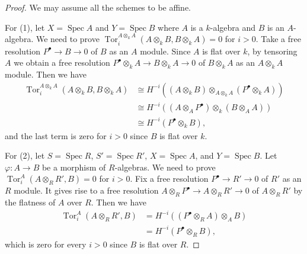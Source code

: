 \documentclass[12pt]{amsart}
\numberwithin{equation}{section}
\theoremstyle{plain}
\theoremstyle{definition}
\DeclareMathOperator{\Tor}{\mathrm{Tor}}
\DeclareMathOperator{\Spec}{\mathrm{Spec}}
\begin{document}
\begin{proof}
    We may assume all the schemes to be affine.

    For (1), let $X = \Spec A$ and $Y = \Spec B$ where $A$ is a $k$-algebra and $B$ is an $A$-algebra.
    We need to prove $\Tor_i^{A \otimes_k A}(A \otimes_k B, B\otimes_k A)=0$ for $i>0$.
    Take a free resolution $P^\bullet \to B \to 0$ of $B$ as an $A$ module.
    Since $A$ is flat over $k$, by tensoring $A$ we obtain a free resolution
    $
        P^\bullet \otimes_k A \to B \otimes_k A \to 0
    $
    of $B \otimes_k A$ as an $A \otimes_k A$ module.
    Then we have\begin{align*}
        \Tor_i^{A \otimes_k A}(A \otimes_k B, B\otimes_k A) & \cong H^{-i}((A \otimes_k B)\otimes_{A \otimes_k A}(P^\bullet \otimes_k A)) \\                                                                  & \cong H^{-i}((A \otimes_A P^\bullet)\otimes_k (B \otimes_A A))              \\
                                                            & \cong  H^{-i}(P^\bullet \otimes_k B),
    \end{align*}
    and the last term is zero for $i>0$ since $B$ is flat over $k$.

    For (2), let $S = \Spec R$, $S' = \Spec R'$, $X = \Spec A$, and $Y = \Spec B$.
    Let $\varphi \colon A \to B$ be a morphism of $R$-algebras.
    We need to prove $\Tor_i^{A}(A \otimes_R R', B)=0$ for $i>0$.
    Fix a free resolution $P^\bullet \to R' \to 0$ of $R'$ as an $R$ module.
    It gives rise to a free resolution $A \otimes_R P^\bullet \to A \otimes_R R' \to 0$ of $A \otimes_R R'$ by the flatness of $A$ over $R$.
    Then we have
    \begin{align}
        \Tor^A_i(A \otimes_R R', B) & = H^{-i}((P^\bullet \otimes_R A) \otimes_A B) \\
                                    & = H^{-i}(P^\bullet \otimes_R  B),
    \end{align}
    which is zero for every $i>0$ since $B$ is flat over $R$.
\end{proof}
\end{document}
